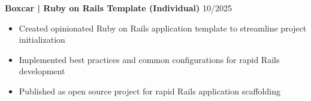 \noindent
\textbf{Boxcar | Ruby on Rails Template (Individual)} \hfill 10/2025
\begin{itemize}
    \item Created opinionated Ruby on Rails application template to streamline project initialization
    \item Implemented best practices and common configurations for rapid Rails development
    \item Published as open source project for rapid Rails application scaffolding
\end{itemize}
